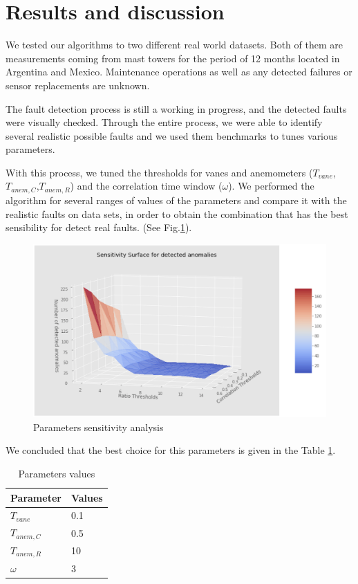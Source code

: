 \documentclass[conference]{IEEEtran}
\begin{document}
\section{Results and discussion}\label{sec:results}
We tested our algorithms to two different real world datasets. Both of them are measurements coming from mast towers  for the period of 12 months located in Argentina and Mexico. Maintenance operations as well as any detected failures or sensor replacements are unknown.

The fault detection process is still a working in progress, and the detected faults were visually checked. Through the entire process, we were able to identify several realistic possible faults and we used them benchmarks to tunes various parameters.

With this process, we tuned the thresholds for vanes and anemometers ($T_{vane}$,$T_{anem,C}$,$T_{anem,R}$) and the correlation time window ($\omega$). We performed the algorithm for several ranges of values of the parameters and compare it with the realistic faults on data sets, in order to obtain the combination that has the best sensibility for detect real faults. (See Fig.\ref{fig:parametersAnalysis}).

\begin{figure}[h]
	\centering
	\includegraphics[width=\columnwidth]{Images/SensitivityAnalysis2.png}
	\caption{Parameters sensitivity analysis}
	\label{fig:parametersAnalysis}
\end{figure}

We concluded that the best choice for this parameters is given in the Table \ref{table:parameterChoice}.
\begin{table}[h]
\begin{center}
	\begin{tabular}{ |l|l| } 
	 \hline
	 Parameter & Values  \\ 
	 \hline
	 $T_{vane}$ & 0.1\\
	 $T_{anem,C}$ &0.5\\
	 $T_{anem,R}$ & 10 \\ 
	 $\omega$ & 3 \\
	 \hline
	\end{tabular}
\caption{Parameters values}
\label{table:parameterChoice}
\end{center}
\end{table}
\end{document}
